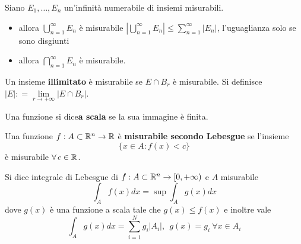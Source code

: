 Siano $E_{1}, \dotsc, E_{n}$ un'infinità numerabile di insiemi misurabili.
\begin{itemize}
\item allora $\bigcup^{\infty}_{n = 1} E_{n}$ è misurabile $\left| \bigcup^{\infty}_{n = 1} E_{n}\right| \leq \sum\nolimits^{\infty}_{n = 1}| E_{n}| $, l'uguaglianza solo se sono disgiunti
\item allora $\bigcap^{\infty}_{n = 1} E_{n}$ è misurabile.
\end{itemize}
\begin{defn}
Un insieme \textbf{illimitato} è misurabile se $E\cap B_{r}$ è misurabile. Si definisce $| E| : = \lim\limits_{r\rightarrow + \infty}| E\cap B_{r}| $.
\end{defn}
\begin{defn}
Una funzione si dice\textbf{a scala} se la sua immagine è finita.
\end{defn}
\begin{defn}
Una funzione $f: A\subset \mathbb{R}^{n}\rightarrow \mathbb{R}$ è \textbf{misurabile secondo Lebesgue} se l'insieme
\begin{equation*}
\{x\in A: f(x) < c\}
\end{equation*}
è misurabile $\forall c\in \RR$.
\end{defn}
\begin{defn}
Si dice integrale di Lebesgue di $f: A\subset \mathbb{R}^{n}\rightarrow [0, + \infty)$ e $A$ misurabile
\begin{equation*}
\int_{A} f(x) dx = \sup \int_{A} g(x) dx
\end{equation*}
dove $g(x)$ è una funzione a scala tale che $g(x) \leq f(x)$ e inoltre vale
\begin{equation*}
\int_{A} g(x) dx = \sum\limits^{N}_{i = 1} g_{i}| A_{i}|, \ \ g(x) = g_{i} \ \forall x\in A_{i}
\end{equation*}
\end{defn}

